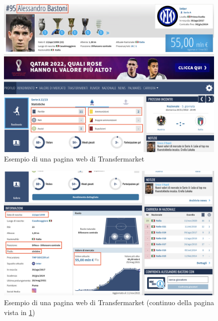 \begin{figure}
    \centering
    \includegraphics[scale=0.4]{img/Transfermarket1.png}
    \caption{Esempio di una pagina web di Transfermarket}
    \label{fig:Transfermarket1}
\end{figure}
\begin{figure}
    \centering
    \includegraphics[scale=0.4]{img/Transfermarket2.png}
    \caption{Esempio di una pagina web di Transfermarket (continuo della pagina vista in \ref{fig:Transfermarket1})}
    \label{fig:Transfermarket2}
\end{figure}

\newpage
